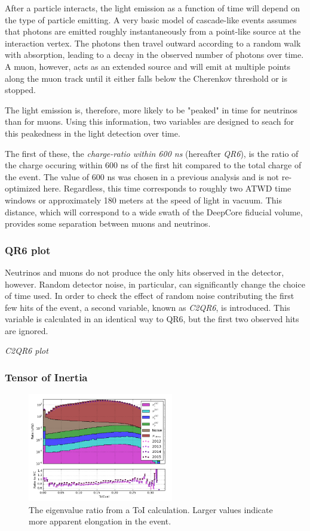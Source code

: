 After a particle interacts, the light emission as a function of time will depend on the type of particle emitting.
A very basic model of cascade-like events assumes that photons are emitted roughly instantaneously from a point-like source at the interaction vertex. 
The photons then travel outward according to a random walk with absorption, leading to a decay in the observed number of photons over time.
A muon, however, acts as an extended source and will emit at multiple points along the muon track until it either falls below the Cherenkov threshold or is stopped.

The light emission is, therefore, more likely to be "peaked" in time for neutrinos than for muons. 
Using this information, two variables are designed to seach for this peakedness in the light detection over time.

The first of these, the \emph{charge-ratio within 600 ns} (hereafter \emph{QR6}), is the ratio of the charge occuring within 600 ns of the first hit compared to the total charge of the event.
The value of 600 ns was chosen in a previous analysis and is not re-optimized here.
Regardless, this time corresponds to roughly two ATWD time windows or approximately 180 meters at the speed of light in vacuum.
This distance, which will correspond to a wide swath of the DeepCore fiducial volume, provides some separation between muons and neutrinos.

\subsubsection{QR6 plot}

Neutrinos and muons do not produce the only hits observed in the detector, however. 
Random detector noise, in particular, can significantly change the choice of time used.
In order to check the effect of random noise contributing the first few hits of the event, a second variable, known as \emph{C2QR6}, is introduced.
This variable is calculated in an identical way to QR6, but the first two observed hits are ignored.

\emph{C2QR6 plot}


\subsubsection{Tensor of Inertia}
\begin{figure}[h]
	\centering
		\includegraphics[width=2.5in]{ToIEval_log.png}
		\caption[Tensor-of-Inertia Eigenvalue Ratio]{The eigenvalue ratio from a ToI calculation. Larger values indicate more apparent elongation in the event.}
	\label{fig:toi_log}
\end{figure}

